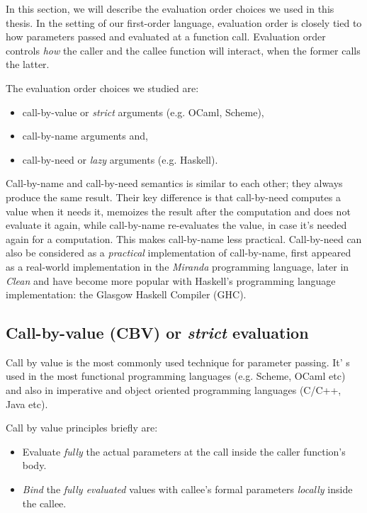 \documentclass[diploma]{softlab-thesis}
\begin{document}
In this section, we will describe the evaluation order choices we used in this thesis. In the setting of our first-order language, evaluation order is closely tied to how parameters passed and evaluated at a function call. Evaluation order controls \textit{how} the caller and the callee function will interact, 
when the former calls the latter. 

The evaluation order choices we studied are: 
\begin{itemize}
  \item call-by-value or \textit{strict} arguments (e.g. OCaml, Scheme), 
  \item call-by-name arguments and,
  \item call-by-need or \textit{lazy} arguments (e.g. Haskell).
\end{itemize}

Call-by-name and call-by-need semantics is similar to each other; they always produce the same result.
Their key difference is that call-by-need computes a value when it needs it, memoizes the result after the computation 
and does not evaluate it again, while call-by-name re-evaluates the value, in case it's needed again for a computation.
This makes call-by-name less practical. Call-by-need can also be considered as a \textit{practical} implementation 
of call-by-name, first appeared as a real-world implementation in the \textit{Miranda} programming 
language, later in \textit{Clean} and have become more popular
with Haskell's programming language implementation: the Glasgow Haskell Compiler (GHC).

\subsection {Call-by-value (CBV) or \textit{strict} evaluation}
\label{sec:cbv}

Call by value is the most commonly used technique for parameter passing. It' s used in the most functional 
programming languages (e.g. Scheme, OCaml etc) and also in imperative and object oriented programming 
languages (C/C++, Java etc).

\par Call by value principles briefly are:
\begin{itemize}
  \item Evaluate \textit{fully} the actual parameters at the call inside the caller function's body.
  \item \textit{Bind} the \textit{fully evaluated} values with callee's formal parameters \textit{locally} inside the callee.
\end{itemize}
\end{document}
